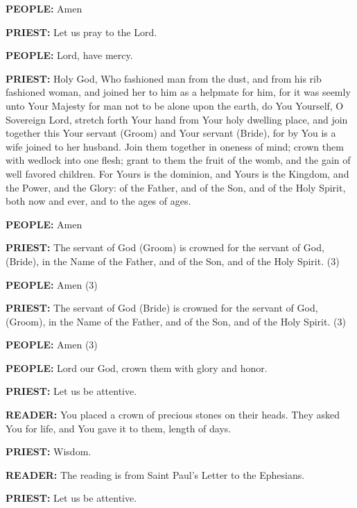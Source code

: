 \textbf{PEOPLE:} Amen

\textbf{PRIEST:} Let us pray to the Lord.

\textbf{PEOPLE:} Lord, have mercy.

\textbf{PRIEST:} Holy God, Who fashioned man from the dust, and from his
rib fashioned woman, and joined her to him as a helpmate for him, for it
was seemly unto Your Majesty for man not to be alone upon the earth, do
You Yourself, O Sovereign Lord, stretch forth Your hand from Your holy
dwelling place, and join together this Your servant (Groom) and Your
servant (Bride), for by You is a wife joined to her husband. Join them
together in oneness of mind; crown them with wedlock into one flesh;
grant to them the fruit of the womb, and the gain of well favored
children. For Yours is the dominion, and Yours is the Kingdom, and the
Power, and the Glory: of the Father, and of the Son, and of the Holy
Spirit, both now and ever, and to the ages of ages.

\textbf{PEOPLE:} Amen

\textbf{PRIEST:} The servant of God (Groom) is crowned for the servant
of God, (Bride), in the Name of the Father, and of the Son, and of the
Holy Spirit. (3)

\textbf{PEOPLE:} Amen (3)

\textbf{PRIEST:} The servant of God (Bride) is crowned for the servant
of God, (Groom), in the Name of the Father, and of the Son, and of the
Holy Spirit. (3)

\textbf{PEOPLE:} Amen (3)

\textbf{PEOPLE:} Lord our God, crown them with glory and honor.

\textbf{PRIEST:} Let us be attentive.

\textbf{READER:} You placed a crown of precious stones on their heads.
They asked You for life, and You gave it to them, length of days.

\textbf{PRIEST:} Wisdom.

\textbf{READER:} The reading is from Saint Paul's Letter to the
Ephesians.

\textbf{PRIEST:} Let us be attentive.

